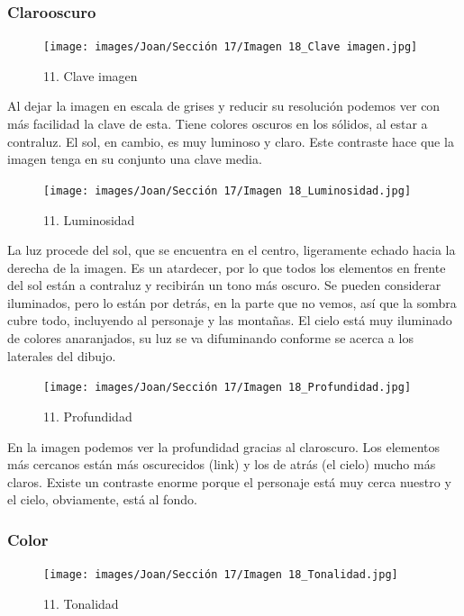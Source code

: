 \documentclass[12pt]{article}
\begin{document}
            \subsubsection{Clarooscuro}
            \begin{figure}[H]
          \centering
          \texttt{[image: images/Joan/Sección 17/Imagen 18\_Clave imagen.jpg]}
          \caption{\small 11. Clave imagen}
        \end{figure}
        Al dejar la imagen en escala de grises y reducir su resolución podemos ver con más facilidad la clave de esta. Tiene colores oscuros en los sólidos, al estar a contraluz. El sol, en cambio, es muy luminoso y claro. Este contraste hace que la imagen tenga en su conjunto una clave media. 

        \begin{figure}[H]
          \centering
          \texttt{[image: images/Joan/Sección 17/Imagen 18\_Luminosidad.jpg]}
          \caption{\small 11. Luminosidad}
        \end{figure}

        La luz procede del sol, que se encuentra en el centro, ligeramente echado hacia la derecha de la imagen. Es un atardecer, por lo que todos los elementos en frente del sol están a contraluz y recibirán un tono más oscuro. Se pueden considerar iluminados, pero lo están por detrás, en la parte que no vemos, así que la sombra cubre todo, incluyendo al personaje y las montañas. El cielo está muy iluminado de colores anaranjados, su luz se va difuminando conforme se acerca a los laterales del dibujo. 

    \begin{figure}[H]
          \centering
          \texttt{[image: images/Joan/Sección 17/Imagen 18\_Profundidad.jpg]}
          \caption{\small 11. Profundidad}
        \end{figure}

        En la imagen podemos ver la profundidad gracias al claroscuro. Los elementos más cercanos están más oscurecidos (link) y los de atrás (el cielo) mucho más claros. 
    Existe un contraste enorme porque el personaje está muy cerca nuestro y el cielo, obviamente, está al fondo. 

            \subsubsection{Color}
    \begin{figure}[H]
          \centering
          \texttt{[image: images/Joan/Sección 17/Imagen 18\_Tonalidad.jpg]}
          \caption{\small 11. Tonalidad}
        \end{figure}
\end{document}
